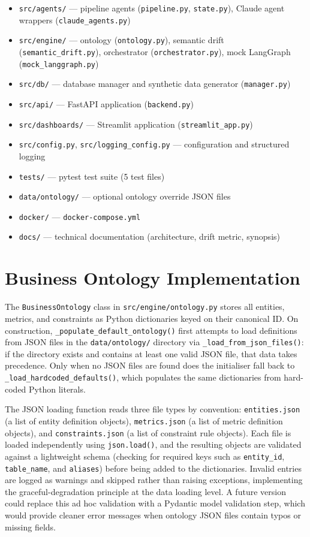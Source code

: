 \documentclass[12pt,a4paper]{report}
\begin{document}
\begin{itemize}[leftmargin=2em]
  \item \texttt{src/agents/} — pipeline agents (\texttt{pipeline.py}, \texttt{state.py}), Claude agent wrappers (\texttt{claude\_agents.py})
  \item \texttt{src/engine/} — ontology (\texttt{ontology.py}), semantic drift (\texttt{semantic\_drift.py}), orchestrator (\texttt{orchestrator.py}), mock LangGraph (\texttt{mock\_langgraph.py})
  \item \texttt{src/db/} — database manager and synthetic data generator (\texttt{manager.py})
  \item \texttt{src/api/} — FastAPI application (\texttt{backend.py})
  \item \texttt{src/dashboards/} — Streamlit application (\texttt{streamlit\_app.py})
  \item \texttt{src/config.py}, \texttt{src/logging\_config.py} — configuration and structured logging
  \item \texttt{tests/} — pytest test suite (5 test files)
  \item \texttt{data/ontology/} — optional ontology override JSON files
  \item \texttt{docker/} — \texttt{docker-compose.yml}
  \item \texttt{docs/} — technical documentation (architecture, drift metric, synopsis)
\end{itemize}

\section{Business Ontology Implementation}
\label{sec:ontology-impl}

The \texttt{BusinessOntology} class in \texttt{src/engine/ontology.py} stores all entities, metrics, and constraints as Python dictionaries keyed on their canonical ID. On construction, \texttt{\_populate\_default\_ontology()} first attempts to load definitions from JSON files in the \texttt{data/ontology/} directory via \texttt{\_load\_from\_json\_files()}: if the directory exists and contains at least one valid JSON file, that data takes precedence. Only when no JSON files are found does the initialiser fall back to \texttt{\_load\_hardcoded\_defaults()}, which populates the same dictionaries from hard-coded Python literals.

The JSON loading function reads three file types by convention: \texttt{entities.json} (a list of entity definition objects), \texttt{metrics.json} (a list of metric definition objects), and \texttt{constraints.json} (a list of constraint rule objects). Each file is loaded independently using \texttt{json.load()}, and the resulting objects are validated against a lightweight schema (checking for required keys such as \texttt{entity\_id}, \texttt{table\_name}, and \texttt{aliases}) before being added to the dictionaries. Invalid entries are logged as warnings and skipped rather than raising exceptions, implementing the graceful-degradation principle at the data loading level. A future version could replace this ad hoc validation with a Pydantic model validation step, which would provide cleaner error messages when ontology JSON files contain typos or missing fields.
\end{document}
